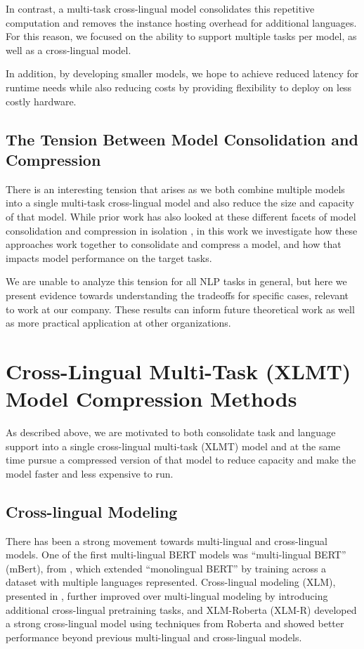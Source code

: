 In contrast, a multi-task cross-lingual model consolidates this repetitive computation and removes the instance hosting overhead for additional languages.
For this reason, we focused on the ability to support multiple tasks per model, as well as a cross-lingual model.

In addition, by developing smaller models, we hope to achieve reduced latency for runtime needs while also reducing costs by providing flexibility to deploy on less costly hardware.

\subsection{The Tension Between Model Consolidation and Compression}
There is an interesting tension that arises as we both combine multiple models into a single multi-task cross-lingual model and also reduce the size and capacity of that model.
While prior work has also looked at these different facets of model consolidation and compression in isolation \cite{wang2020minilm, wang2020minilmv2, mukherjee2021xtremedistiltransformers, jiao2021lightmbert, sanh2019distilbert, jiao2020tinybert, de2020optimal,yang2019model}, in this work we investigate how these approaches work together to consolidate and compress a model, and how that impacts model performance on the target tasks.

We are unable to analyze this tension for all NLP tasks in general, but here we present evidence towards understanding the tradeoffs for specific cases, relevant to work at our company.
These results can inform future theoretical work as well as more practical application at other organizations.
\section{Cross-Lingual Multi-Task (XLMT) Model Compression Methods}
As described above, we are motivated to both consolidate task and language support into a single cross-lingual multi-task (XLMT) model and at the same time pursue a compressed version of that model to reduce capacity and make the model faster and less expensive to run.

\subsection{Cross-lingual Modeling}
There has been a strong movement towards multi-lingual and cross-lingual models.
One of the first multi-lingual BERT models was ``multi-lingual BERT'' (mBert), from \cite{devlin-etal-2019-bert}, which extended ``monolingual BERT'' by training across a dataset with multiple languages represented.
Cross-lingual modeling (XLM), presented in \cite{conneau2019cross}, further improved over multi-lingual modeling by introducing additional cross-lingual pretraining tasks, and 
XLM-Roberta (XLM-R) \cite{XLMR} developed a strong cross-lingual model using techniques from Roberta \cite{roberta} and showed better performance beyond previous multi-lingual and cross-lingual models.

